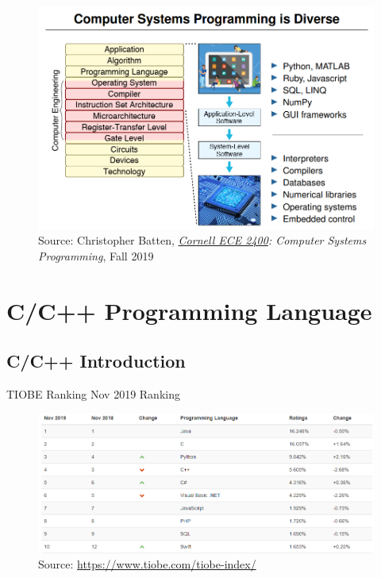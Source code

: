 \documentclass{../TexTemplate/myslide}
\begin{document}
\begin{frame}
\begin{figure}
\centering
\includegraphics[width=0.9\linewidth]{fig/computer_system_stack.png}
\caption*{\scriptsize Source: Christopher Batten, \emph{\href{https://www.csl.cornell.edu/courses/ece2400/handouts/ece2400-overview.pdf}{Cornell ECE 2400}: Computer Systems Programming}, Fall 2019}
\end{figure}
\end{frame}

\section{C/C++ Programming Language}
\begin{frame}
\sectionpage
\end{frame}

\subsection{C/C++ Introduction}
\begin{frame}
\subsectionpage
\end{frame}
\begin{frame}{TIOBE Ranking}
Nov 2019 Ranking
\begin{figure}
\centering
\includegraphics[width=\linewidth]{fig/TIOBE.png}
\caption*{\scriptsize Source: \url{https://www.tiobe.com/tiobe-index/}}
\end{figure}
\end{frame}
\end{document}
